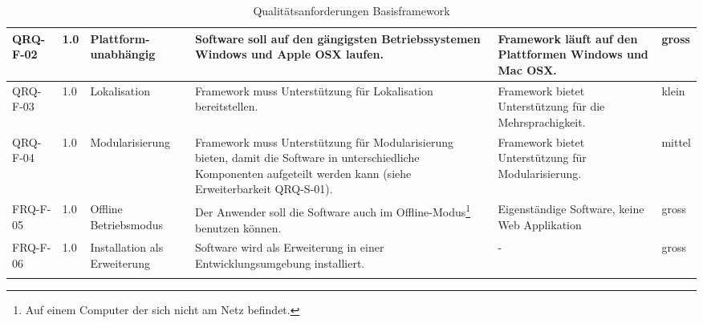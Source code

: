\begin{landscape}
\begin{longtable}{|p{1.8cm}|p{0.7cm}|p{2.5cm}|p{7cm}|p{4cm}|p{0.9cm}|}
   QRQ-F-02 & 1.0 & Plattform-unabhängig & Software soll auf den gängigsten Betriebssystemen Windows und Apple OSX laufen. &  Framework läuft auf den Plattformen Windows und Mac OSX. & gross \\\hline

   QRQ-F-03 & 1.0 & Lokalisation & Framework muss Unterstützung für Lokalisation bereitstellen. & Framework bietet Unterstützung für die Mehrsprachigkeit. &klein \\\hline

   QRQ-F-04 & 1.0 & Modularisierung & Framework muss Unterstützung für Modularisierung bieten, damit die Software in unterschiedliche Komponenten aufgeteilt werden kann (siehe Erweiterbarkeit QRQ-S-01). & Framework bietet Unterstützung für Modularisierung.&mittel \\\hline

   FRQ-F-05 & 1.0 & Offline Betriebsmodus & Der Anwender soll die Software auch im Offline-Modus\footnote{Auf einem Computer der sich nicht am Netz befindet.} benutzen können. & Eigenständige Software, keine Web Applikation & gross  \\\hline

   FRQ-F-06 & 1.0 & Installation als Erweiterung& Software wird als Erweiterung in einer Entwicklungsumgebung installiert. & - & gross  \\\hline

    \caption{Qualitätsanforderungen Basisframework}
\end{longtable}
\end{landscape}



